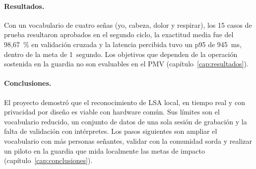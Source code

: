 \paragraph{Resultados.} Con un vocabulario de cuatro señas (yo, cabeza, dolor y respirar), los 15 casos de prueba resultaron aprobados en el segundo ciclo, la exactitud media fue del 98,67~\% en validación cruzada y la latencia percibida tuvo un p95 de 945~ms, dentro de la meta de 1~segundo. Los objetivos que dependen de la operación sostenida en la guardia no son evaluables en el PMV (capítulo~\ref{cap:resultados}).

\paragraph{Conclusiones.} El proyecto demostró que el reconocimiento de LSA local, en tiempo real y con privacidad por diseño es viable con hardware común. Sus límites son el vocabulario reducido, un conjunto de datos de una sola sesión de grabación y la falta de validación con intérpretes. Los pasos siguientes son ampliar el vocabulario con más personas señantes, validar con la comunidad sorda y realizar un piloto en la guardia que mida localmente las metas de impacto (capítulo~\ref{cap:conclusiones}).
